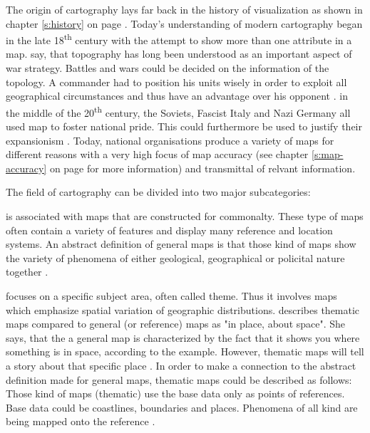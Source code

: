 The origin of cartography lays far back in the history of visualization as shown in chapter \ref{s:history} on page \pageref{s:history}. Today's understanding of modern cartography began in the late 18\textsuperscript{th} century with the attempt to show more than one attribute in a map. \citeauthor{Longley2005} say, that topography has long been understood as an important aspect of war strategy. Battles and wars could be decided on the information of the topology. A commander had to position his units wisely in order to exploit all geographical circumstances and thus have an advantage over his opponent .
in the middle of the 20\textsuperscript{th} century, the Soviets, Fascist Italy and Nazi Germany all used map to foster national pride. This could furthermore be used to justify their expansionism .
Today, national organisations produce a variety of maps for different reasons with a very high focus of map accuracy (see chapter \ref{s:map-accuracy} on page \pageref{s:map-accuracy} for more information) and transmittal of relvant information.

The field of cartography can be divided into two major subcategories:
\begin{enumerate}
 is associated with maps that are constructed for commonalty. These type of maps often contain a variety of features and display many reference and location systems. An abstract definition of general maps is that those kind of maps show the variety of phenomena of either geological, geographical or policital nature together .

 focuses on a specific subject area, often called theme. Thus it involves maps which emphasize spatial variation of geographic distributions. \citeauthor{BartzPetchenik1979} describes thematic maps compared to general (or reference) maps as "in place, about space". She says, that the a general map is characterized by the fact that it shows you where something is in space, according to the example. However, thematic maps will tell a story about that specific place .
In order to make a connection to the abstract definition \citeauthor{Thrower2008} made for general maps, thematic maps could be described as follows:
Those kind of maps (thematic) use the base data only as points of references. Base data could be coastlines, boundaries and places. Phenomena of all kind are being mapped onto the reference .
\end{enumerate}

